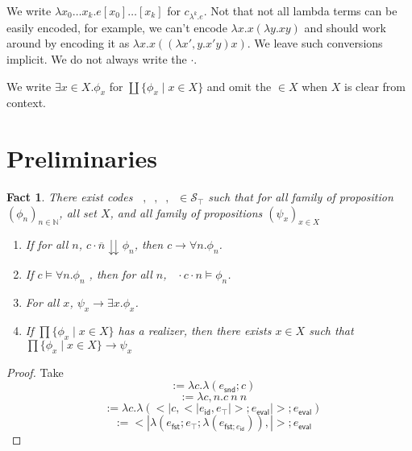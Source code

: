 \documentclass{article}
\newtheorem{fact}{Fact}
\DeclareMathOperator{\introexists}{\mathsf{intro}_\exists}
\DeclareMathOperator{\introforall}{\mathsf{intro}_\forall}
\DeclareMathOperator{\elimexists}{\mathsf{elim}_\exists}
\DeclareMathOperator{\elimforall}{\mathsf{elim}_\forall}
\newcommand{\N}{\mathbb{N}}
\newcommand{\septop}{\mathcal{S}_\top}
\begin{document}
We write $\lambda x_0 \dots x_k. e[x_0]\dots[x_k]$ for $c_{\lambda^k. e}$.
Not that not all lambda terms can be easily encoded, for example, we can't encode $\lambda x. x (\lambda y. xy)$
and should work around by encoding it as $\lambda x. x ((\lambda x', y. x' y) x)$.
We leave such conversions implicit.
We do not always write the $\cdot$.

We write $\exists x \in X. \phi_x$ for $\coprod \{\phi_x \mid x \in X\}$ and omit the $\in X$ when $X$ is clear from context.

\section{Preliminaries}

\begin{fact}
    There exist codes $\introexists, \introforall, \elimexists, \elimforall \in \septop$ such that for all family of proposition $(\phi_n)_{n \in \N}$, all set $X$, and all family of propositions $(\psi_x)_{x \in X}$
    \begin{enumerate}
        \item If for all $n$, $c \cdot \overline{n} \downdownarrows \phi_n$, then $c \xrightarrow{\introforall} \forall n. \phi_n$. 
        \item If $c \models \forall n. \phi_n$ 
        , then for all $n$, $\elimforall \cdot c \cdot n \models \phi_n$.
        \item For all $x$, $\psi_x \xrightarrow{\introexists} \exists x. \phi_x$.
        \item If $\prod \{ \phi_x \mid x \in X \}$ has a realizer, then there exists $x \in X$ such that $\prod \{ \phi_x \mid x \in X \} \xrightarrow{\elimexists} \psi_x$
    \end{enumerate}
\end{fact}
\begin{proof}
    Take
    \[\introforall := \lambda c. \lambda (e_{\mathsf{snd}}; c)\]
    \[\elimforall := \lambda c, n. c\ n\ n\]
    \[\introexists := \lambda c. \lambda(<|c, <|e_{\mathsf{id}}, e_\top|>; e_{\mathsf{eval}}|>; e_{\mathsf{eval}})\]
    \[\elimexists := <|\lambda (e_{\mathsf{fst}}; e_\top; \lambda(e_{\mathsf{fst}; e_{\mathsf{id}}})), |>; e_{\mathsf{eval}}\]
\end{proof}
\end{document}
